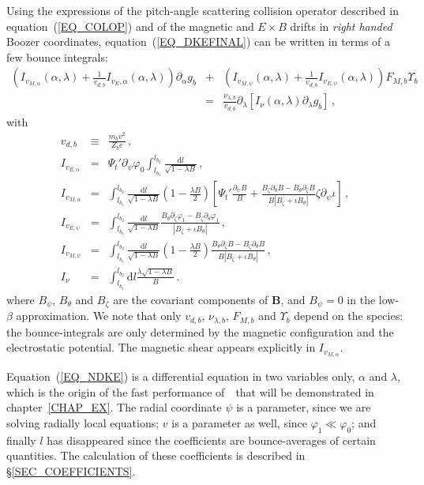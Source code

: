 Using the expressions of the pitch-angle scattering collision operator described in equation~(\ref{EQ_COLOP}) and of the magnetic and $E\times B$ drifts in \textit{right handed} Boozer coordinates, equation~(\ref{EQ_DKEFINAL}) can be written in terms of a few bounce integrals:
\begin{eqnarray}
\left(I_{v_{M,\alpha}} (\alpha,\lambda)+\frac{1}{v_{d,b}}I_{v_E,\alpha}(\alpha,\lambda)\right)\partial_\alpha g_b &+& \left( I_{v_{M,\psi}}(\alpha,\lambda)+\frac{1}{v_{d,b}}I_{v_{E,\psi}}(\alpha,\lambda)\right) F_{M,b}\Upsilon_b\nonumber \\
&=& \frac{\nu_{\lambda,b}}{v_{d,b}} \partial_\lambda\left[ I_\nu(\alpha,\lambda) \partial_\lambda g_b\right]\,,
\label{EQ_NDKE}
\end{eqnarray}
with
\begin{eqnarray}
v_{d,b}&\equiv&\frac{m_bv^2}{Z_be}\,,\nonumber\\
I_{v_{E,\alpha}}&=&\Psi_t'\partial_\psi\varphi_0\int_{l_{b_1}}^{l_{b_2}} \frac{\mathrm{d}l}{\sqrt{1-\lambda B}}\,,\nonumber\\
I_{v_{M,\alpha}}&=&\int_{l_{b_1}}^{l_{b_2}}\frac{\mathrm{d}l }{\sqrt{1-\lambda B}}\left(1-\frac{\lambda B}{2}\right)\left[\Psi_t'\frac{\partial_\psi B}{B}+
 \frac{B_\zeta\partial_\theta B - B_\theta\partial_\zeta B}{B|B_\zeta+\iota B_\theta|}\zeta\partial_\psi \iota\right]\,,\nonumber\\
I_{v_{E,\psi}}&=&\int_{l_{b_1}}^{l_{b_2}} \frac{\mathrm{d}l}{\sqrt{1-\lambda B}}\frac{B_\theta\partial_\zeta \varphi_1 - B_\zeta\partial_\theta \varphi_1}{|B_\zeta+\iota B_\theta|}\,,\nonumber\\
I_{v_{M,\psi}}&=&\int_{l_{b_1}}^{l_{b_2}} \frac{\mathrm{d}l }{\sqrt{1-\lambda B}}\left(1-\frac{\lambda B}{2}\right)\frac{B_\theta\partial_\zeta B - B_\zeta\partial_\theta B}{B|B_\zeta+\iota B_\theta|}\,,\nonumber\\
I_\nu&=&\int_{l_{b_1}}^{l_{b_2}} \mathrm{d}l\frac{\lambda\sqrt{1-\lambda B}}{B}\,.
\label{EQ_BINT}
\end{eqnarray}
where $B_\psi$, $B_\theta$ and $B_\zeta$ are the covariant components of $\mathbf{B}$, and $B_\psi=0$ in the low-$\beta$ approximation. We note that only $v_{d,b}$, $\nu_{\lambda,b}$, $F_{M,b}$ and $\Upsilon_b$ depend on the species: the bounce-integrals are only determined by the magnetic configuration and the electrostatic potential. {The magnetic shear appears explicitly  in $I_{v_{M,\alpha}}$.}

Equation~(\ref{EQ_NDKE}) is a differential equation in two variables only, $\alpha$ and $\lambda$, which is the origin of the fast performance of~\KNOSOS~that will be demonstrated in chapter~\ref{CHAP_EX}. The radial coordinate $\psi$ is a parameter, since we are solving radially local equations; $v$ is a parameter as well, since $\varphi_1\ll \varphi_0$; and finally $l$ has disappeared since the coefficients are bounce-averages of certain quantities. The calculation of these coefficients is described in \S\ref{SEC_COEFFICIENTS}.


